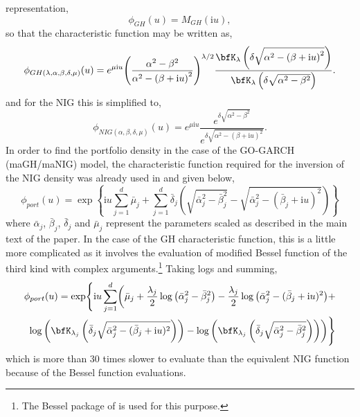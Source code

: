 representation,
\begin{equation}\label{appendixI:eq:chartrick}
{\phi _{GH}}(u) = {M_{GH}}({\text{i}}u),
\end{equation}
so that the characteristic function may be written as,
\begin{equation}\label{appendixI:eq:ghypchar}
{\phi _{GH(\lambda ,\alpha ,\beta ,\delta ,\mu )}}(u) = {e^{\mu \text{i}u}}{\left( {\frac{{{\alpha ^2} - {\beta ^2}}}{{{\alpha ^2} - {{(\beta  + {\text{i}}u)}^2}}}} \right)^{\lambda /2}}\frac{{{\bfK_\lambda }\left( {\delta \sqrt {{\alpha ^2} - {{(\beta  + {\text{i}}u)}^2}} } \right)}}{{{\bfK_\lambda }\left( {\delta \sqrt {{\alpha ^2} - {\beta ^2}} } \right)}}.
\end{equation}
and for the NIG this is simplified to,
\begin{equation}\label{appendixI:eq:nigchar}
{\phi _{NIG(\alpha ,\beta ,\delta ,\mu )}}(u) = {e^{\mu {\text{i}}u}}\frac{{{e^{\delta \sqrt {{\alpha ^2} - {\beta ^2}} }}}}{{{e^{\delta \sqrt {{\alpha ^2} - {{(\beta  + {\text{i}}u)}^2}} }}}}.
\end{equation}
In order to find the portfolio density in the case of the GO-GARCH (maGH/maNIG) model, the
characteristic function required for the inversion of the NIG density was already
used in \cite{Chen2007a} and given below,
\begin{equation}\label{appendixI:eq:nigcharsum}
{\phi _{port}}(u) = \exp \left\{ {{\text{i}}u\sum\limits_{j = 1}^d {{{\bar \mu }_j}}  + \sum\limits_{j = 1}^d {{{\bar \delta }_j}\left( {\sqrt {\bar \alpha _j^2 - \bar \beta _j^2}  - \sqrt {\bar \alpha _j^2 - {{({{\bar \beta }_j} + {\text{i}}u)}^2}} } \right)} } \right\}
\end{equation}
where $\bar \alpha_j$, $\bar \beta_j$, $\bar \delta_j$ and $\bar \mu_j$
represent the parameters scaled as described in the main text of the paper.
In the case of the GH characteristic function, this is a little more complicated
as it involves the evaluation of modified Bessel function of the
third kind with complex arguments.\footnote{The Bessel package
of \cite{Maechler2012} is used for this purpose.} Taking logs and summing,
\begin{eqnarray}\label{appendixI:eq:ghypcharsum}
{\phi _{port}}(u) = \exp\Biggl\{\text{i}u \sum\limits_{j = 1}^d \biggl({\bar \mu }_j+ \frac{\lambda _j}{2}\log{\left( {\bar \alpha _j^2 - \bar \beta _j^2} \right)} - \frac{\lambda _j}{2} \log{\left( \bar \alpha _j^2 - ({\bar \beta }_j + {\text{i}}u)^2 \right)} +  \nonumber \\
\log{\left( \bfK_{\lambda_j}\left( {\bar \delta }_j\sqrt{\bar \alpha _j^2 - ({\bar \beta }_j + \text{i}u)^2}\right) \right)} - \log{\left( \bfK_{\lambda _j}\left({\bar \delta}_j \sqrt{\bar \alpha _j^2 - \bar \beta _j^2} \right) \right)} \biggr) \Biggr\}
\end{eqnarray}
which is more than 30 times slower to evaluate than the equivalent NIG function
because of the Bessel function evaluations.
